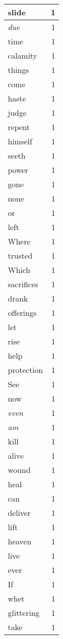 \begin{center}
\begin{longtable}{l|r}
slide & 1 \\ \hline
\emph{due} & 1 \\ \hline
time & 1 \\ \hline
calamity & 1 \\ \hline
things & 1 \\ \hline
come & 1 \\ \hline
haste & 1 \\ \hline
judge & 1 \\ \hline
repent & 1 \\ \hline
himself & 1 \\ \hline
seeth & 1 \\ \hline
power & 1 \\ \hline
gone & 1 \\ \hline
none & 1 \\ \hline
or & 1 \\ \hline
left & 1 \\ \hline
Where & 1 \\ \hline
trusted & 1 \\ \hline
Which & 1 \\ \hline
sacrifices & 1 \\ \hline
drank & 1 \\ \hline
offerings & 1 \\ \hline
let & 1 \\ \hline
rise & 1 \\ \hline
help & 1 \\ \hline
protection & 1 \\ \hline
See & 1 \\ \hline
now & 1 \\ \hline
\emph{even} & 1 \\ \hline
\emph{am} & 1 \\ \hline
kill & 1 \\ \hline
alive & 1 \\ \hline
wound & 1 \\ \hline
heal & 1 \\ \hline
can & 1 \\ \hline
deliver & 1 \\ \hline
lift & 1 \\ \hline
heaven & 1 \\ \hline
live & 1 \\ \hline
ever & 1 \\ \hline
If & 1 \\ \hline
whet & 1 \\ \hline
glittering & 1 \\ \hline
take & 1 \\ \hline

\end{longtable}
\end{center}
